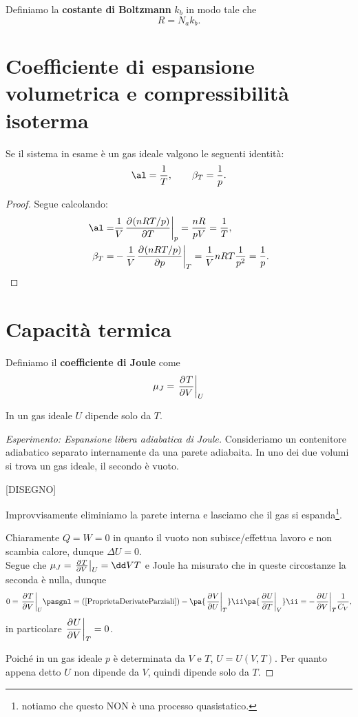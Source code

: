 \begin{definition}
Definiamo la \textbf{costante di Boltzmann} $k_b$ in modo tale che 
\[R=N_a k_b.\]
\end{definition}

\section{Coefficiente di espansione volumetrica e compressibilit\`a isoterma}

\begin{proposition}\label{CoefficienteEspansioneECompressibilitaIsotermaPerGasIdeali}
Se il sistema in esame \`e un gas ideale valgono le seguenti identit\`a:
\[\al=\frac 1T,\qquad \beta_T=\frac 1p.\]
\end{proposition}
\begin{proof}
Segue calcolando:
\begin{align*}
\al=&\frac1V\ppb T{(nRT/p)}p=\frac{nR}{pV}=\frac1T,\\
\beta_T=&-\frac1V\ppb p{(nRT/p)}T=\frac1V nRT\frac1{p^2}=\frac1p.
\end{align*}
\end{proof}

\section{Capacit\`a termica}

\begin{definition}
Definiamo il \textbf{coefficiente di Joule} come
\[\mu_J=\ppb VTU\]
\end{definition}

\begin{fact}\label{InGasIdealeUdipendeSoloDaT}
In un gas ideale $U$ dipende solo da $T$.
\end{fact}
\begin{proof}[Esperimento: Espansione libera adiabatica di Joule]
Consideriamo un contenitore adiabatico separato internamente da una parete adiabaita. In uno dei due volumi si trova un gas ideale, il secondo \`e vuoto.

[DISEGNO]

\noindent
Improvvisamente eliminiamo la parete interna e lasciamo che il gas si espanda\footnote{notiamo che questo NON \`e una processo quasistatico.}.\smallskip

\noindent
Chiaramente $Q=W=0$ in quanto il vuoto non subisce/effettua lavoro e non scambia calore, dunque $\Delta U=0$.\\
Segue che $\mu_J=\ppb VTU=\dd VT$ e Joule ha misurato che in queste circostanze la seconda \`e nulla, dunque
\[0=\ppb VTU\pasgnl={(\ref{ProprietaDerivateParziali})}-\pa{\ppb UVT}\ii\pa{\ppb TUV}\ii=-\ppb VUT\frac1{C_V},\]
in particolare $\displaystyle\ppb VUT=0$.\medskip

\noindent Poich\'e in un gas ideale $p$ \`e determinata da $V$ e $T$, $U=U(V,T)$. Per quanto appena detto $U$ non dipende da $V$, quindi dipende solo da $T$.
\end{proof}


